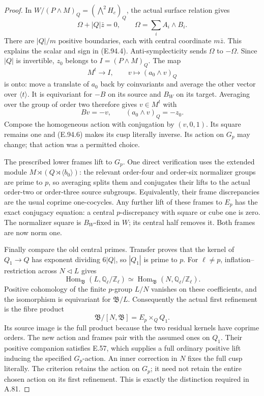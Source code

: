 \begin{proof}
In \(W/(P\wedge M)_Q=(\bigwedge^2H_c)_Q\), the actual
surface relation gives
\[
 \Omega+|Q|\bar z=0,\qquad
 \Omega=\sum_i A_i\wedge B_i.                            \tag{E.94.4}
\]
There are \(|Q|/m\) positive boundaries, each with central
coordinate \(m\bar z\).  This explains the scalar and sign
in (E.94.4).
Anti-symplecticity sends \(\Omega\) to \(-\Omega\).
Since \(|Q|\) is invertible, \(z_0\) belongs to
\(I=(P\wedge M)_Q\).
The map
\[
 M^t\longrightarrow I,\qquad v\longmapsto(a_0\wedge v)_Q
                                                        \tag{E.94.5}
\]
is onto: move a translate of \(a_0\) back by coinvariants
and average the other vector over \(\langle t\rangle\).
It is equivariant for \(-B\) on its source and \(B_W\)
on its target.  Averaging over the group of order two
therefore gives \(v\in M^t\) with
\[
 Bv=-v,\qquad(a_0\wedge v)_Q=-z_0.
                                                        \tag{E.94.6}
\]
Compose the homogeneous action with conjugation by \((v,0,1)\).
Its square remains one and (E.94.6) makes its cusp literally
inverse.  Its action on \(G_p\) may change; that action was a
permitted choice.

The prescribed lower frames lift to \(G_p\).
One direct verification uses the extended module
\(M\rtimes(Q\rtimes\langle b_0\rangle)\):
the relevant order-four and order-six normalizer groups
are prime to \(p\), so averaging splits them and conjugates
their lifts to the actual order-two or order-three source
subgroups.  Equivalently, their frame discrepancies are
the usual coprime one-cocycles.
Any further lift of these frames to \(E_p\) has the exact
conjugacy equation: a central \(p\)-discrepancy with square
or cube one is zero.
The normalizer square is \(B_W\)-fixed in \(W\); its central
half removes it.  Both frames are now norm one.

Finally compare the old central primes.
Transfer proves that the kernel of \(Q_1\to Q\) has exponent
dividing \(6|Q|\), so \(|Q_1|\) is prime to \(p\).
For \(\ell\ne p\), inflation--restriction across \(N\lhd L\)
gives
\[
 \operatorname{Hom}_{\mathfrak B}(L,\mathbb Q_\ell/\mathbb Z_\ell)
 \simeq
 \operatorname{Hom}_{\mathfrak B}(N,\mathbb Q_\ell/\mathbb Z_\ell).
                                                        \tag{E.94.7}
\]
Positive cohomology of the finite \(p\)-group \(L/N\)
vanishes on these coefficients, and the isomorphism is
equivariant for \(\mathfrak B/L\).
Consequently the actual first refinement is the fibre product
\[
 \mathfrak B/[N,\mathfrak B]=E_p\times_QQ_1.              \tag{E.94.8}
\]
Its source image is the full product because the two residual
kernels have coprime orders.
The new action and frames pair with the assumed ones on \(Q_1\).
Their positive companion satisfies E.57, which supplies a full
ordinary positive lift inducing the specified \(G_p\)-action.
An inner correction in \(N\) fixes the full cusp literally.
The criterion retains the action on \(G_p\); it need not retain
the entire chosen action on its first refinement.
This is exactly the distinction required in A.81.
\end{proof}
